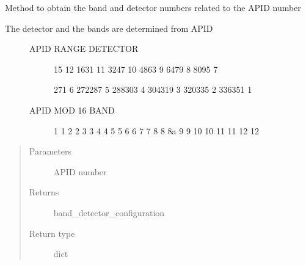 \begin{fulllineitems}
\label{\detokenize{s2boa.ingestions:s2boa.ingestions.functions.get_band_detector}}
\sphinxAtStartPar
Method to obtain the band and detector numbers related to the APID number
\begin{description}
\item[{The detector and the bands are determined from APID}] \leavevmode\begin{description}
\item[{APID RANGE     DETECTOR}] \leavevmode
{}\sphinxhyphen{}15           12
16\sphinxhyphen{}31           11
32\sphinxhyphen{}47           10
48\sphinxhyphen{}63           9
64\sphinxhyphen{}79           8
80\sphinxhyphen{}95           7

\sphinxhyphen{}271           6
272\sphinxhyphen{}287           5
288\sphinxhyphen{}303           4
304\sphinxhyphen{}319           3
320\sphinxhyphen{}335           2
336\sphinxhyphen{}351           1

\item[{APID MOD 16     BAND}] \leavevmode
{}           1
1           2
2           3
3           4
4           5
5           6
6           7
7           8
8           8a
9           9
10          10
11          11
12          12

\end{description}

\end{description}
\begin{quote}\begin{description}
\item[{Parameters}] \leavevmode
\sphinxAtStartPar
{} \textendash{} APID number

\item[{Returns}] \leavevmode
\sphinxAtStartPar
band\_detector\_configuration

\item[{Return type}] \leavevmode
\sphinxAtStartPar
dict

\end{description}\end{quote}

\end{fulllineitems}


